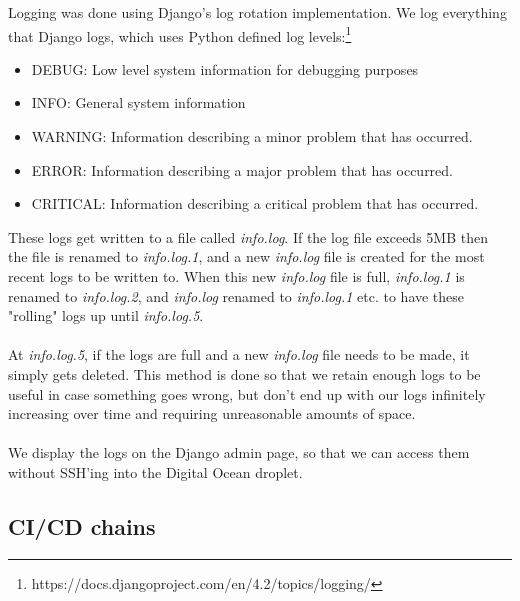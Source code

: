Logging was done using Django's log rotation implementation. We log everything that Django logs, which uses Python defined log levels:\footnote{https://docs.djangoproject.com/en/4.2/topics/logging/}

\begin{itemize}
    \item DEBUG: Low level system information for debugging purposes
    \item INFO: General system information
    \item WARNING: Information describing a minor problem that has occurred.
    \item ERROR: Information describing a major problem that has occurred.
    \item CRITICAL: Information describing a critical problem that has occurred. 
\end{itemize}

These logs get written to a file called \textit{info.log}. If the log file exceeds 5MB then the file is renamed to \textit{info.log.1}, and a new \textit{info.log} file is created for the most recent logs to be written to. When this new \textit{info.log} file is full, \textit{info.log.1} is renamed to \textit{info.log.2}, and \textit{info.log} renamed to \textit{info.log.1} etc. to have these "rolling" logs up until \textit{info.log.5}.
\\\\
At \textit{info.log.5}, if the logs are full and a new \textit{info.log} file needs to be made, it simply gets deleted. This method is done so that we retain enough logs to be useful in case something goes wrong, but don't end up with our logs infinitely increasing over time and requiring unreasonable amounts of space.
\\\\
We display the logs on the Django admin page, so that we can access them without SSH'ing into the Digital Ocean droplet.

\subsection*{CI/CD chains}


